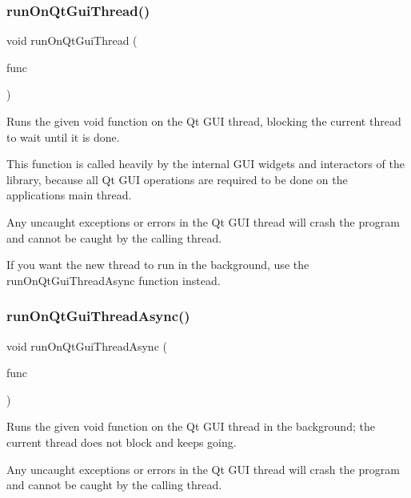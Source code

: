 \subsubsection{\texorpdfstring{run\+On\+Qt\+Gui\+Thread()}{runOnQtGuiThread()}}
{\footnotesize\ttfamily void run\+On\+Qt\+Gui\+Thread (\begin{DoxyParamCaption}\item[{G\+Thunk}]{func }\end{DoxyParamCaption})\hspace{0.3cm}{\ttfamily [static]}}



Runs the given void function on the Qt G\+UI thread, blocking the current thread to wait until it is done. 

This function is called heavily by the internal G\+UI widgets and interactors of the library, because all Qt G\+UI operations are required to be done on the application\textquotesingle{}s main thread.

Any uncaught exceptions or errors in the Qt G\+UI thread will crash the program and cannot be caught by the calling thread.

If you want the new thread to run in the background, use the {\ttfamily run\+On\+Qt\+Gui\+Thread\+Async} function instead. \mbox{\label{classGThread_a4445680030c65d610b9e348d8d0cffc8}} 
\subsubsection{\texorpdfstring{run\+On\+Qt\+Gui\+Thread\+Async()}{runOnQtGuiThreadAsync()}}
{\footnotesize\ttfamily void run\+On\+Qt\+Gui\+Thread\+Async (\begin{DoxyParamCaption}\item[{G\+Thunk}]{func }\end{DoxyParamCaption})\hspace{0.3cm}{\ttfamily [static]}}



Runs the given void function on the Qt G\+UI thread in the background; the current thread does not block and keeps going. 

Any uncaught exceptions or errors in the Qt G\+UI thread will crash the program and cannot be caught by the calling thread.

